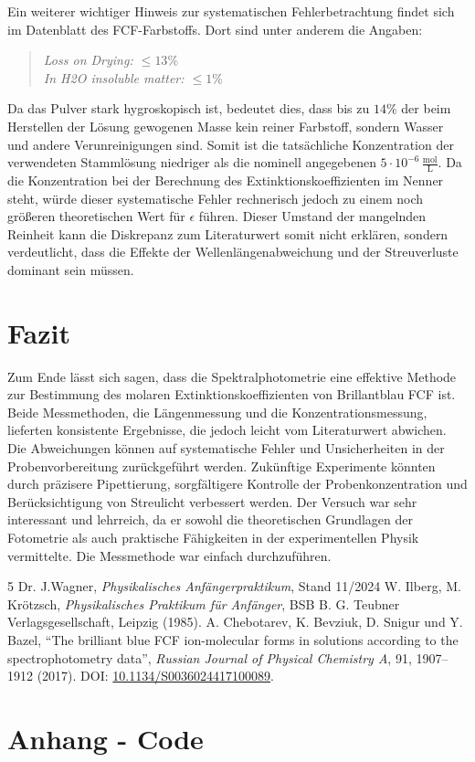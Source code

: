 \documentclass[12pt,a4paper,titlepage]{scrartcl}
\numberwithin{equation}{section}
\numberwithin{table}{section}
\numberwithin{figure}{section}
\begin{document}
\medskip
Ein weiterer wichtiger Hinweis zur systematischen Fehlerbetrachtung findet sich im Datenblatt des FCF-Farbstoffs. Dort sind unter anderem die Angaben:
\begin{quote}
    \emph{Loss on Drying: $\le 13\%$}\\
    \emph{In H2O insoluble matter: $\le 1\%$}
\end{quote}

Da das Pulver stark hygroskopisch ist, bedeutet dies, dass bis zu $14\%$ der beim Herstellen der Lösung gewogenen Masse kein reiner Farbstoff, sondern Wasser und andere Verunreinigungen sind. Somit ist die tatsächliche Konzentration der verwendeten Stammlösung niedriger als die nominell angegebenen $5 \cdot 10^{-6} \, \frac{\text{mol}}{\text{L}}$. Da die Konzentration bei der Berechnung des Extinktionskoeffizienten im Nenner steht, würde dieser systematische Fehler rechnerisch jedoch zu einem noch größeren theoretischen Wert für $\epsilon$ führen. Dieser Umstand der mangelnden Reinheit kann die Diskrepanz zum Literaturwert somit nicht erklären, sondern verdeutlicht, dass die Effekte der Wellenlängenabweichung und der Streuverluste dominant sein müssen.



\section{Fazit}
Zum Ende lässt sich sagen, dass die Spektralphotometrie eine effektive Methode zur Bestimmung des molaren Extinktionskoeffizienten von Brillantblau FCF ist. Beide Messmethoden, die Längenmessung und die Konzentrationsmessung, lieferten konsistente Ergebnisse, die jedoch leicht vom Literaturwert abwichen. Die Abweichungen können auf systematische Fehler und Unsicherheiten in der Probenvorbereitung zurückgeführt werden. Zukünftige Experimente könnten durch präzisere Pipettierung, sorgfältigere Kontrolle der Probenkonzentration und Berücksichtigung von Streulicht verbessert werden. Der Versuch war sehr interessant und lehrreich, da er sowohl die theoretischen Grundlagen der Fotometrie als auch praktische Fähigkeiten in der experimentellen Physik vermittelte. Die Messmethode war einfach durchzuführen. 




\clearpage

\listoffigures


\listoftables

\begin{thebibliography}{5}
     Dr. J.Wagner, \emph{Physikalisches Anfängerpraktikum}, Stand 11/2024
     W. Ilberg, M. Krötzsch, \emph{Physikalisches Praktikum für Anfänger}, BSB B. G. Teubner Verlagsgesellschaft, Leipzig (1985).
     A. Chebotarev, K. Bevziuk, D. Snigur und Y. Bazel, ``The brilliant blue FCF ion-molecular forms in solutions according to the spectrophotometry data'', \emph{Russian Journal of Physical Chemistry A}, 91, 1907--1912 (2017). DOI: \href{https://doi.org/10.1134/S0036024417100089}{10.1134/S0036024417100089}.
    
\end{thebibliography}

\appendix
\section{Anhang - Code}

\end{document}
